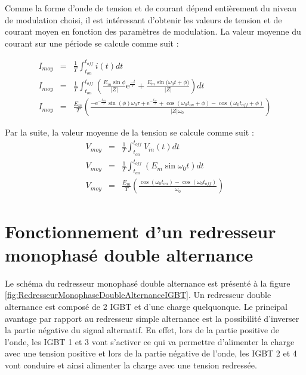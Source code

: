 Comme la forme d'onde de tension et de courant dépend entièrement du niveau de modulation choisi, il est intéressant d'obtenir les valeurs de tension et de courant moyen en fonction des paramètres de modulation. La valeur moyenne du courant sur une période se calcule comme suit :

\begin{eqnarray}
I_{moy} &=& \frac{1}{T}\int_{t_{on}}^{t_{off}} i(t) dt \\
I_{moy} &=& \frac{1}{T}\int_{t_{on}}^{t_{off}} \left( \frac{E_m\sin{\phi}}{|Z|}\mbox{e}^{\frac{-t}{\tau}} + \frac{E_m\sin{(\omega_0 t + \phi})}{|Z|}\right) dt \\
I_{moy} &=& \frac{E_m}{T} \left( \frac{-\mbox{e}^{-\frac{t_{off}}{\tau}}\sin{(\phi)}\omega_0 \tau + \mbox{e}^{-\frac{t_{on}}{\tau}} + \cos{(\omega_0 t_{on} + \phi)}-\cos{(\omega_0 t_{off} + \phi)}}{|Z|\omega_0} \right)
\end{eqnarray}

Par la suite, la valeur moyenne de la tension se calcule comme suit : 
\begin{eqnarray}
V_{moy} &=& \frac{1}{T}\int_{t_{on}}^{t_{off}} V_{in}(t) dt \\
V_{moy} &=& \frac{1}{T}\int_{t_{on}}^{t_{off}} (E_m \sin{\omega_0 t}) dt \\
V_{moy} &=& \frac{E_m}{T} \left( \frac{\cos{(\omega_0 t_{on})} - \cos{(\omega_0 t_{off})}}{\omega_0} \right)
\end{eqnarray}

\section{Fonctionnement d'un redresseur monophasé double alternance}
Le schéma du redresseur monophasé double alternance est présenté à la figure \ref{fig:RedresseurMonophaseDoubleAlternanceIGBT}. Un redresseur double alternance est composé de 2 IGBT et d'une charge quelquonque. Le principal avantage par rapport au redresseur simple alternance est la possibilité d'inverser la partie négative du signal alternatif. En effet, lors de la partie positive de l'onde, les IGBT 1 et 3 vont s'activer ce qui va permettre d'alimenter la charge avec une tension positive et lors de la partie négative de l'onde, les IGBT 2 et 4 vont conduire et ainsi alimenter la charge avec une tension redressée. 


